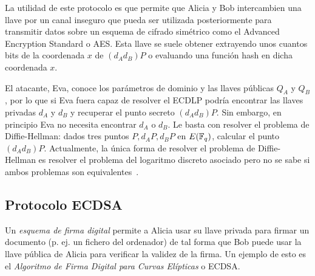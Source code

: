 La utilidad de este protocolo es que permite que Alicia y Bob intercambien una llave por un canal inseguro que pueda ser utilizada posteriormente para transmitir datos sobre un esquema de cifrado simétrico como el Advanced Encryption Standard o AES. Esta llave se suele obtener extrayendo unos cuantos bits de la coordenada $x$ de $(d_A d_B) P$ o evaluando una función hash en dicha coordenada $x$.

El atacante, Eva, conoce los parámetros de dominio y las llaves públicas $Q_A$ y $Q_B$, por lo que si Eva fuera capaz de resolver el ECDLP podría encontrar las llaves privadas $d_A$ y $d_B$ y recuperar el punto secreto $(d_A d_B) P$. Sin embargo, en principio Eva no necesita encontrar $d_A$ o $d_B$. Le basta con resolver el problema de Diffie-Hellman: dados tres puntos $P, d_A P, d_B P$ en $E(\mathbb{F}_q)$, calcular el punto $(d_A d_B) P$. Actualmente, la única forma de resolver el problema de Diffie-Hellman es resolver el problema del logaritmo discreto asociado pero no se sabe si ambos problemas son equivalentes~\cite{Hankerson:2003}.

\subsection{Protocolo ECDSA}
\label{sub:Protocolo ECDSA}

Un \emph{esquema de firma digital} permite a Alicia usar su llave privada para firmar un documento (p. ej. un fichero del ordenador) de tal forma que Bob puede usar la llave pública de Alicia para verificar la validez de la firma. Un ejemplo de esto es el \emph{Algoritmo de Firma Digital para Curvas Elípticas} o ECDSA.

